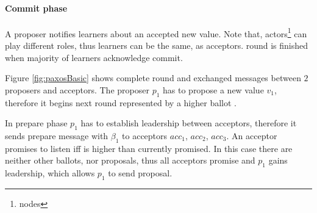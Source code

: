 \paragraph{Commit phase}
A proposer notifies learners about an accepted new value. Note that, actors\footnote{nodes} can play different roles, thus learners can be the same, as acceptors. \paxos round is finished when majority of learners acknowledge commit.



Figure \ref{fig:paxosBasic} shows complete \paxos round and exchanged messages between $2$ proposers and acceptors. The proposer $p_1$ has to propose a new value $v_1$, therefore it begins next \paxos round represented by a higher ballot \ballot.

In prepare phase $p_1$ has to establish leadership between acceptors, therefore it sends prepare message with $\beta_1$ to acceptors $acc_1$, $acc_2$, $acc_3$. An acceptor promises to listen iff \ballot is higher than currently promised. In this case there are neither other ballots, nor proposals, thus all acceptors promise and $p_1$ gains leadership, which allows $p_1$ to send proposal.

